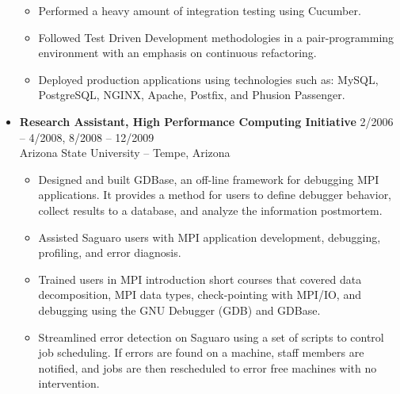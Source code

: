 \documentclass[10pt,letterpaper]{article}
\begin{document}
\begin{itemize}
\begin{itemize}
  \item Performed a heavy amount of integration testing using Cucumber.

  \item Followed Test Driven Development methodologies in a pair-programming
  environment with an emphasis on continuous refactoring.

  \item Deployed production applications using technologies such as: MySQL,
  PostgreSQL, NGINX, Apache, Postfix, and Phusion Passenger.

\end{itemize}


\item \textbf{Research Assistant, High Performance Computing Initiative}
\hfill{2/2006 -- 4/2008, 8/2008 -- 12/2009} \\
Arizona State University -- Tempe, Arizona

\begin{itemize}

  \item Designed and built GDBase, an off-line framework for debugging MPI
  applications. It provides a method for users to define debugger behavior,
  collect results to a database, and analyze the information postmortem.



  \item Assisted Saguaro users with MPI application development, debugging,
  profiling, and error diagnosis.

  \item Trained users in MPI introduction short courses that covered data
  decomposition, MPI data types, check-pointing with MPI/IO, and debugging using
  the GNU Debugger (GDB) and GDBase.

  \item Streamlined error detection on Saguaro using a set of scripts to control
  job scheduling. If errors are found on a machine, staff members are notified,
  and jobs are then rescheduled to error free machines with no intervention.


\end{itemize}
\end{itemize}
\end{document}
